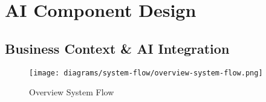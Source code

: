 \chapter{AI Component Design}
\label{chap:ai-component-design}





\section{Business Context \& AI Integration}

\label{section:business-context-ai-integration}
\begin{figure}[H]
    \centering
    \texttt{[image: diagrams/system-flow/overview-system-flow.png]}
    \caption{Overview System Flow}
    \label{fig:overview-system-flow}
\end{figure}

